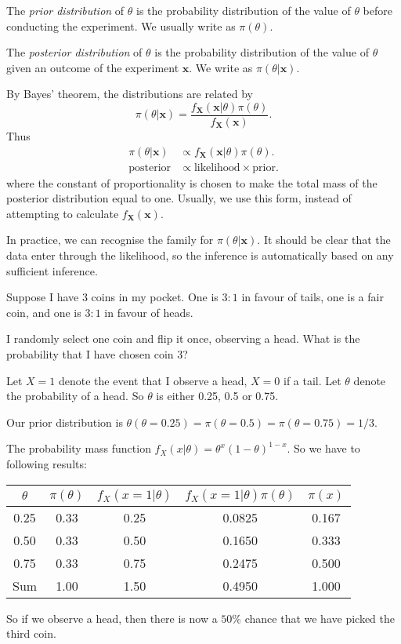 \documentclass[a4paper]{article}
\begin{document}
\begin{defi}
  The \emph{prior distribution} of $\theta$ is the probability distribution of the value of $\theta$ before conducting the experiment. We usually write as $\pi(\theta)$. 

  The \emph{posterior distribution} of $\theta$ is the probability distribution of the value of $\theta$ given an outcome of the experiment $\mathbf{x}$. We write as $\pi(\theta|\mathbf{x})$.
\end{defi}
By Bayes' theorem, the distributions are related by
\[
  \pi(\theta|\mathbf{x}) = \frac{f_{\mathbf{X}}(\mathbf{x}|\theta)\pi(\theta)}{f_{\mathbf{X}}(\mathbf{x})}.
\]
Thus
\begin{align*}
  \pi(\theta|\mathbf{x}) &\propto f_{\mathbf{X}}(\mathbf{x}|\theta)\pi(\theta).\\
  \text{posterior} &\propto \text{likelihood}\times\text{prior}.
\end{align*}
where the constant of proportionality is chosen to make the total mass of the posterior distribution equal to one. Usually, we use this form, instead of attempting to calculate $f_\mathbf{X}(\mathbf{x})$.

In practice, we can recognise the family for $\pi(\theta|\mathbf{x})$. It should be clear that the data enter through the likelihood, so the inference is automatically based on any sufficient inference.

\begin{eg}
  Suppose I have $3$ coins in my pocket. One is $3:1$ in favour of tails, one is a fair coin, and one is $3:1$ in favour of heads.

  I randomly select one coin and flip it once, observing a head. What is the probability that I have chosen coin 3?

  Let $X = 1$ denote the event that I observe a head, $X = 0$ if a tail. Let $\theta$ denote the probability of a head. So $\theta$ is either 0.25, 0.5 or 0.75.

  Our prior distribution is $\theta(\theta = 0.25) = \pi(\theta = 0.5) = \pi(\theta = 0.75) = 1/3$.

  The probability mass function $f_X(x|\theta) = \theta^x(1 - \theta)^{1 - x}$. So we have to following results:

  \begin{tabular}{ccccc}
    \toprule
    $\theta$ & $\pi(\theta)$ & $f_X(x = 1|\theta)$ & $f_X(x = 1|\theta)\pi(\theta)$ & $\pi(x)$\\
    \midrule
    0.25 & 0.33 & 0.25 & 0.0825 & 0.167\\
    0.50 & 0.33 & 0.50 & 0.1650 & 0.333\\
    0.75 & 0.33 & 0.75 & 0.2475 & 0.500\\
    \midrule
    Sum & 1.00 & 1.50 & 0.4950 & 1.000\\
    \bottomrule
  \end{tabular}

  So if we observe a head, then there is now a $50\%$ chance that we have picked the third coin.
\end{eg}
\end{document}
